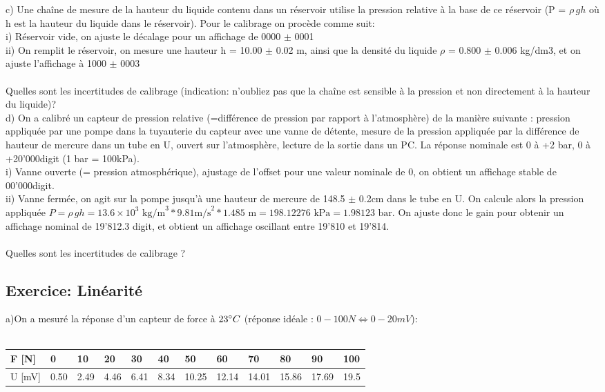 c)	Une chaîne de mesure de la hauteur du liquide contenu dans un réservoir utilise la pression relative à la base de ce réservoir (P = $\rho\,gh$ où h est la hauteur du liquide dans le réservoir). Pour le calibrage on procède comme suit: \\
i)	Réservoir vide, on ajuste le décalage pour un affichage de 0000  $\pm$  0001 \\
ii)	On remplit le réservoir, on mesure une hauteur h = 10.00 $\pm$ 0.02 m, ainsi que la densité du liquide  $\rho$ = 0.800  $\pm$  0.006 kg/dm3, et on ajuste l'affichage à 1000  $\pm$  0003 \\ ~ \\
Quelles sont les incertitudes de calibrage (indication: n'oubliez pas que la chaîne est sensible à la pression et non directement à la hauteur du liquide)? \\

d)	On a calibré un capteur de pression relative (=différence de pression par rapport à l'atmosphère) de la manière suivante : pression appliquée par une pompe dans la tuyauterie du capteur avec une vanne de détente, mesure de la pression appliquée par la différence de hauteur de mercure dans un tube en U, ouvert sur l'atmosphère, lecture de la sortie dans un PC. La réponse nominale est 0 à +2 bar, 0 à +20'000digit (1 bar = 100kPa). \\
i)	Vanne ouverte (= pression atmosphérique), ajustage de l'offset pour une valeur nominale de 0, on obtient un affichage stable de 00'000digit. \\
ii)	Vanne fermée, on agit sur la pompe jusqu'à une hauteur de mercure de 148.5 $\pm$ 0.2cm dans le tube en U. On calcule alors la pression appliquée $P=\rho\,gh = 13.6\times10^3 \text{ kg/m}^3 * 9.81\text {m/s}^2 * 1.485\text{ m}=198.12276\text{ kPa} = 1.98123\text{ bar}$. On ajuste donc le gain pour obtenir un affichage nominal de 19'812.3 digit, et obtient un affichage oscillant entre 19'810 et 19'814. \\ ~\\
Quelles sont les incertitudes de calibrage ?

\subsection{Exercice: Linéarité}

a)On a mesuré la réponse d'un capteur de force à $23 \degree C$ (réponse idéale : $0-100N \Leftrightarrow 0-20 mV$):\\
~
\\
\begin{tabular}{|l|l|l|l|l|l|l|l|l|l|l|l|}
\hline
F [N]	& 0	& 10	& 20	& 30	& 40	& 50	& 60	& 70	& 80	& 90	& 100 \\
\hline
U [mV]	& 0.50	& 2.49	& 4.46	& 6.41	& 8.34	& 10.25	& 12.14	& 14.01	& 15.86	& 17.69	& 19.5 \\
\hline
\end{tabular}
\\

